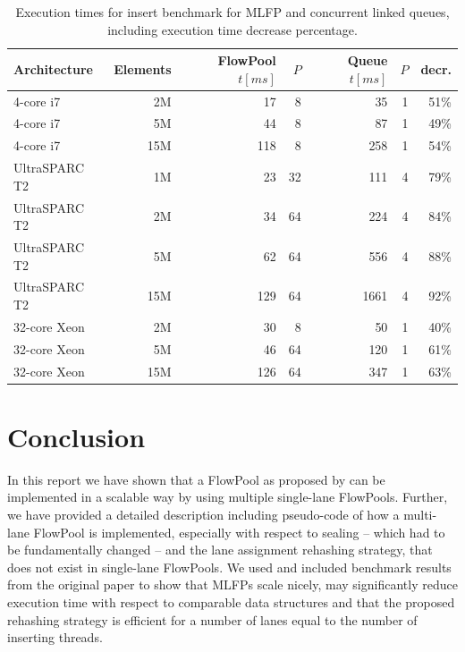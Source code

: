 \documentclass[runningheads,a4paper,fleqn]{llncs}
\begin{document}
\begin{table}[t]
\centering
\begin{tabular}{l@{\qquad}r@{\quad}r@{\quad}r@{\quad}r@{\quad}r@{\qquad}r}
  Architecture & Elements & FlowPool $t [ms]$ & $P$ & Queue $t [ms]$ & $P$ & decr.\\
\hline
    4-core i7 &  2M &  17 &  8 &   35 & 1 & 51\%\\
    4-core i7 &  5M &  44 &  8 &   87 & 1 & 49\%\\
    4-core i7 & 15M & 118 &  8 &  258 & 1 & 54\%\\
\hline
UltraSPARC T2 &  1M &  23 & 32 &  111 & 4 & 79\%\\
UltraSPARC T2 &  2M &  34 & 64 &  224 & 4 & 84\%\\
UltraSPARC T2 &  5M &  62 & 64 &  556 & 4 & 88\%\\
UltraSPARC T2 & 15M & 129 & 64 & 1661 & 4 & 92\%\\
\hline
 32-core Xeon &  2M &  30 &  8 &   50 & 1 & 40\%\\
 32-core Xeon &  5M &  46 & 64 &  120 & 1 & 61\%\\
 32-core Xeon & 15M & 126 & 64 &  347 & 1 & 63\%\\
\end{tabular}

\caption{Execution times for insert benchmark for MLFP and concurrent
  linked queues, including execution time decrease
  percentage.} \label{tbl:execution-times}
\end{table}

\section{Conclusion}
In this report we have shown that a FlowPool as proposed by
\cite{FP12} can be implemented in a scalable way by using multiple
single-lane FlowPools. Further, we have provided a detailed
description including pseudo-code of how a multi-lane FlowPool is
implemented, especially with respect to sealing -- which had to be
fundamentally changed -- and the lane assignment rehashing strategy,
that does not exist in single-lane FlowPools. We used and included
benchmark results from the original paper to show that MLFPs scale
nicely, may significantly reduce execution time with respect to
comparable data structures and that the proposed rehashing strategy is
efficient for a number of lanes equal to the number of inserting
threads.



\end{document}
